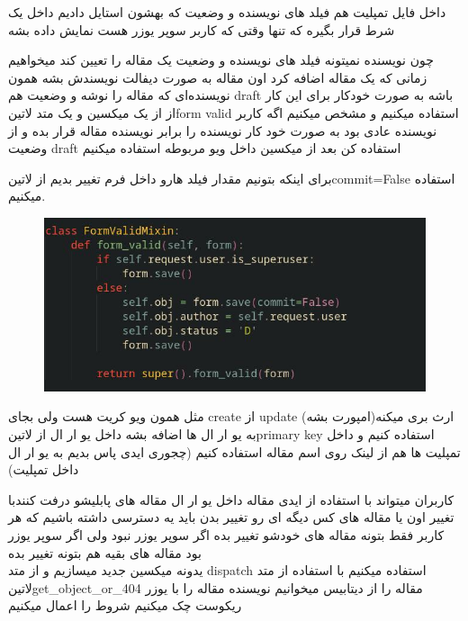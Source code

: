 \documentclass{article}
\begin{document}
		 داخل فایل تمپلیت هم فیلد های نویسنده و وضعیت که بهشون استایل دادیم داخل یک شرط قرار بگیره که تنها وقتی که کاربر
		 سوپر یوزر هست نمایش داده بشه
	
			چون نویسنده نمیتونه فیلد های نویسنده و وضعیت یک مقاله را تعیین کند میخواهیم زمانی که یک مقاله اضافه کرد اون مقاله
			به صورت دیفالت نویسندش بشه همون نویسنده‌ای که مقاله را نوشه و وضعیت هم draft باشه به صورت خودکار برای این کار از
			از یک میکسین و یک متد ‌لاتین{form valid} استفاده میکنیم و مشخص میکنیم اگه کاربر نویسنده عادی بود به صورت خود 
			کار نویسنده را برابر نویسنده مقاله قرار بده و از وضعیت draft استفاده کن بعد از میکسین داخل ویو مربوطه استفاده 
			میکنیم 
			
			برای اینکه بتونیم مقدار فیلد هارو داخل فرم تغییر بدیم از ‌لاتین{commit=False} استفاده میکنیم. 
		
		\begin{figure}[h!]
			\includegraphics[width=\linewidth]{mehran-tarif-course-code-pic/FormValidMixinPic.jpg}
		\end{figure}
	
		مثل همون ویو کریت هست ولی بجای create از update ارث بری میکنه(امپورت بشه) به یو ار ال ها اضافه بشه داخل یو ار ال از
		 ‌لاتین{primary key} استفاده کنیم و داخل تمپلیت ها هم از لینک روی اسم مقاله استفاده کنیم (چجوری ایدی پاس بدیم به یو ار ال داخل 
		 تمپلیت) 
	
	 کاربران میتواند با استفاده از ایدی مقاله داخل یو ار ال مقاله های پابلیشو درفت کنندبا تغییر اون یا مقاله های کس دیگه ای رو تغییر بدن
	 باید یه دسترسی داشته باشیم که هر کاربر فقط بتونه مقاله های خودشو تغییر بده اگر سوپر یوزر نبود ولی اگر سوپر یوزر بود مقاله های بقیه هم
	 بتونه تغییر بده\\
	 	 یدونه میکسین جدید میسازیم و از متد dispatch استفاده میکنیم
	 	 با استفاده از متد ‌لاتین{get\_object\_or\_404} مقاله را از دیتابیس میخوانیم
	 	 نویسنده مقاله را با یوزر ریکوست چک میکنیم 
	 	 شروط را اعمال میکنیم
	 	
\end{document}
